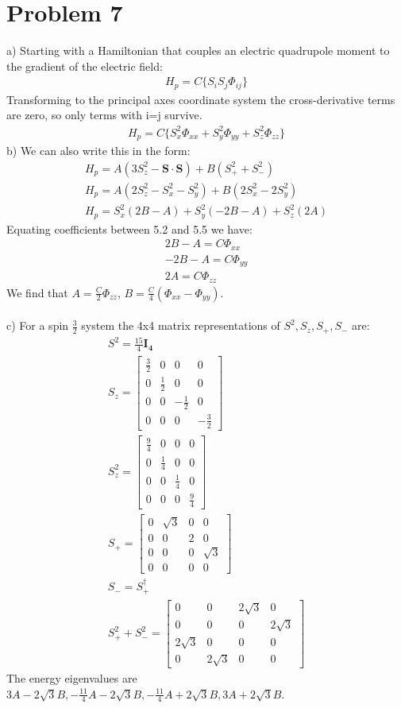 \documentclass[a4paper,12pt]{article}
\numberwithin{equation}{section}
\newcommand{\bv}[1]{\mathbf{#1}}
\begin{document}
\section{Problem 7}
a) Starting with a Hamiltonian that couples an electric quadrupole moment to the gradient of the electric field:
\begin{gather}
 H_p=C\{ S_iS_j\Phi_{ij}\}
\end{gather}
Transforming to the principal axes coordinate system the cross-derivative terms are zero, so only terms with i=j survive.
\begin{gather}
 H_p=C\{S_x^2\Phi_{xx}+S_y^2\Phi_{yy}+S_z^2\Phi_{zz}\}
\end{gather}
b) We can also write this in the form:
\begin{gather}
 H_p = A(3S_z^2-\bv{S}\cdot\bv{S})+B(S_+^2+S_-^2)\\
 H_p = A(2S_z^2-S_x^2-S_y^2)+B(2S_x^2-2S_y^2)\\
 H_p = S_x^2(2B-A)+S_y^2(-2B-A)+S_z^2(2A)
\end{gather}
Equating coefficients between 5.2 and 5.5 we have:
\begin{gather}
 2B-A=C\Phi_{xx}\\
 -2B-A=C\Phi_{yy}\\
 2A=C\Phi_{zz}
\end{gather}
We find that $A=\frac{C}{2}\Phi_{zz}$, $B=\frac{C}{4}(\Phi_{xx}-\Phi_{yy} )$.\\ \\
c) For a spin $\frac{3}{2}$ system the 4x4 matrix representations of $S^2, S_z, S_+,S_-$ are:
\begin{gather}
 S^2 = \frac{15}{4}\bv{I_4}\\
 S_z=\begin{bmatrix}\frac{3}{2}&0&0&0\\0&\frac{1}{2}&0&0\\0&0&-\frac{1}{2}&0\\0&0&0&-\frac{3}{2} \end{bmatrix}\\
 S_z^2 = \begin{bmatrix}\frac{9}{4}&0&0&0\\0&\frac{1}{4}&0&0\\0&0&\frac{1}{4}&0\\0&0&0&\frac{9}{4} \end{bmatrix}\\
 S_+=\begin{bmatrix}0&\sqrt{3}&0&0\\0&0&2&0\\0&0&0&\sqrt{3}\\0&0&0&0\end{bmatrix}\\
 S_-=S_+^\dagger\\
 S_+^2+S_-^2=\begin{bmatrix}0&0&2\sqrt{3}&0\\0&0&0&2\sqrt{3}\\2\sqrt{3}&0&0&0\\0&2\sqrt{3}&0&0\end{bmatrix}
\end{gather}
The energy eigenvalues are $3A-2\sqrt{3}B, -\frac{11}{4}A-2\sqrt{3}B, -\frac{11}{4}A+2\sqrt{3}B, 3A+2\sqrt{3}B$.
\end{document}

